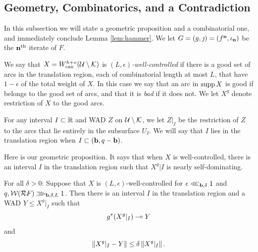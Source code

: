 \subsection{Geometry, Combinatorics, and a Contradiction} \label{align:ggc}

In this subsection we will state a geometric proposition and a combinatorial one, and immediately conclude Lemma \ref{lem:hammer}. We let $G = (g, \jmath) = (f^{\mathbf{n}}, \iota_{\mathbf{n}})$ be the $\mathbf{n}^{\text{th}}$ iterate of $F$. 

We say that $X = W_{\operatorname{can}}^{h+v}(\mathcal U \setminus \mathcal K)$ is \emph{$(L, \epsilon)$-well-controlled}  if there is a good set of arcs in the translation region, each of combinatorial length at most $L$, that have $1 - \epsilon$ of the total weight of $X$.  In this case we say that an arc in $\operatorname{supp} X$ is good if belongs to the good set of arcs, and that it is \emph{bad} if it does not.  We let $X^g$ denote restriction of $X$ to the good arcs. 

For any interval $I\subset \mathbb R$ and  WAD $Z$ on $\mathcal U \setminus \mathcal K$, we let $Z|_I$ be the restriction of $Z$ to the arcs that lie entirely in the subsurface $U_I$. We will say that $I$ lies in the translation region when $I\subset (\mathbf b, q-\mathbf b)$.

Here is our geometric proposition. It says that when $X$ is well-controlled, there is an interval $I$ in the translation region such that $X^g|I$ is nearly self-dominating. 
\begin{prop}  \label{prop:interval-self-dominating}
For all $\delta> 0$:
Suppose that $X$ is $(L, \epsilon)$-well-controlled
for $\epsilon \lll_{\mathbf b, \delta} 1$ and $q, \mathcal W(\mathcal R F) \ggg_{\mathbf b, \delta, L} 1$.
Then there is an interval $I$ in the translation region and a WAD $Y \le X^g|_I$ such that 
\begin{equation} \label{eq:interval-self-dominating-dominated}
g^*(X^g|_I) \multimap Y
\end{equation}
and 
\begin{equation} \label{eq:interval-self-dominating-control}
\left\Vert X^g|_I - Y \right\Vert \le \delta \left\Vert X^g|_I \right\Vert.
\end{equation}
\end{prop}

